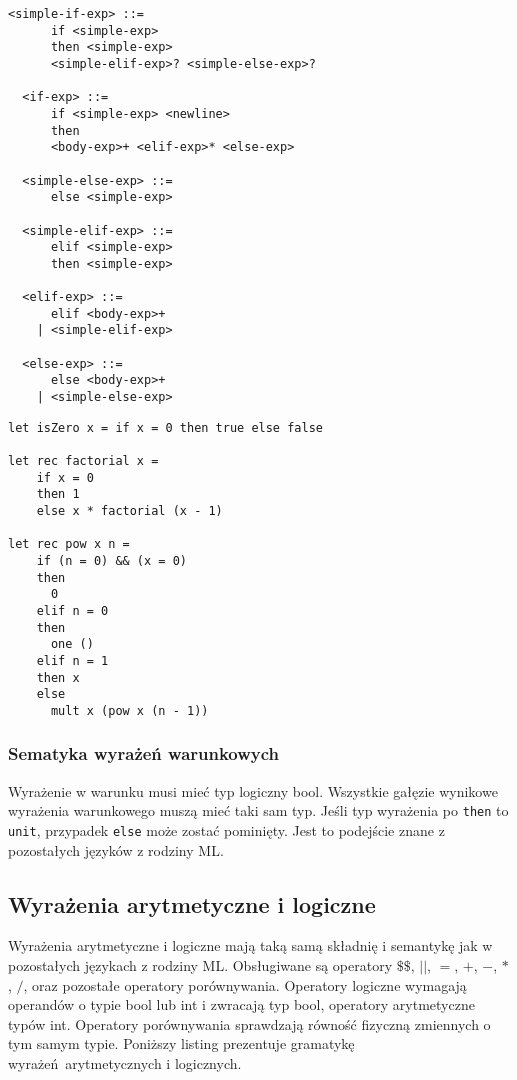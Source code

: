 \documentclass[declaration,shortabstract]{iithesis}
\begin{document}
\begin{lstlisting}[frame=single, caption=Wyrażenia warunkowe.]
  <simple-if-exp> ::= 
      if <simple-exp>  
      then <simple-exp> 
      <simple-elif-exp>? <simple-else-exp>?

  <if-exp> ::= 
      if <simple-exp> <newline>
      then 
      <body-exp>+ <elif-exp>* <else-exp>

  <simple-else-exp> ::=
      else <simple-exp> 

  <simple-elif-exp> ::=
      elif <simple-exp>
      then <simple-exp> 

  <elif-exp> ::=
      elif <body-exp>+ 
    | <simple-elif-exp> 

  <else-exp> ::=
      else <body-exp>+ 
    | <simple-else-exp> 
\end{lstlisting}

\begin{lstlisting}[frame=single, caption=Przykłady wyrażeń warunkowych.]
let isZero x = if x = 0 then true else false

let rec factorial x = 
    if x = 0 
    then 1 
    else x * factorial (x - 1)

let rec pow x n = 
    if (n = 0) && (x = 0)
    then 
      0 
    elif n = 0 
    then 
      one ()
    elif n = 1 
    then x
    else 
      mult x (pow x (n - 1))
\end{lstlisting}

\subsubsection{Sematyka wyrażeń warunkowych}
Wyrażenie w warunku musi mieć typ logiczny bool. Wszystkie gałęzie wynikowe
wyrażenia warunkowego muszą mieć taki sam typ. Jeśli typ wyrażenia po 
\texttt{then} 
to \texttt{unit}, przypadek \texttt{else} może zostać pominięty.
Jest to podejście znane z pozostałych języków z rodziny ML.

\subsection{Wyrażenia arytmetyczne i logiczne}
Wyrażenia arytmetyczne i logiczne mają taką samą składnię i semantykę
jak w pozostałych językach z rodziny ML. Obsługiwane są operatory $\$\$$, 
$||$, $=$, $+$, $-$, $*$, $/$, oraz pozostałe operatory porównywania. 
Operatory logiczne wymagają operandów o typie 
bool lub int i zwracają typ bool, operatory arytmetyczne typów int. 
Operatory porównywania 
sprawdzają równość fizyczną zmiennych o tym samym typie.
Poniższy listing prezentuje gramatykę wyrażeń arytmetycznych i logicznych.
\end{document}
